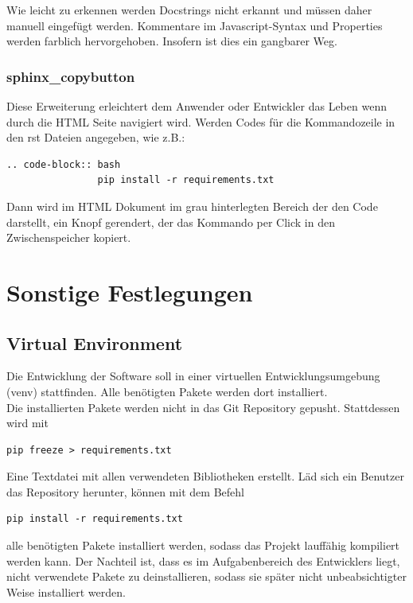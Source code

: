 Wie leicht zu erkennen werden Docstrings nicht erkannt und müssen daher manuell eingefügt werden.
Kommentare im Javascript-Syntax und Properties werden farblich hervorgehoben.
Insofern ist dies ein gangbarer Weg.

\subsubsection{sphinx\_copybutton}

Diese Erweiterung erleichtert dem Anwender oder Entwickler das Leben wenn durch die HTML Seite navigiert wird.
Werden Codes für die Kommandozeile in den rst Dateien angegeben, wie z.B.:
\begin{lstlisting}[label={lst:sphinxCodebutton}]
        .. code-block:: bash
                pip install -r requirements.txt
\end{lstlisting}
Dann wird im HTML Dokument im grau hinterlegten Bereich der den Code darstellt, ein Knopf gerendert,
der das Kommando per Click in den Zwischenspeicher kopiert.



\section{Sonstige Festlegungen}

\subsection{Virtual Environment}

Die Entwicklung der Software soll in einer virtuellen Entwicklungsumgebung (venv) stattfinden.
Alle benötigten Pakete werden dort installiert. \\

Die installierten Pakete werden nicht in das Git Repository gepusht. Stattdessen wird mit
\begin{lstlisting}[label={lst:freezeReq}]
        pip freeze > requirements.txt
\end{lstlisting}
Eine Textdatei mit allen verwendeten Bibliotheken erstellt.
Läd sich ein Benutzer das Repository herunter, können mit dem Befehl
\begin{lstlisting}[label={lst:installReq}]
        pip install -r requirements.txt
\end{lstlisting}
alle benötigten Pakete installiert werden, sodass das Projekt lauffähig kompiliert werden kann.
Der Nachteil ist, dass es im Aufgabenbereich des Entwicklers liegt, nicht verwendete Pakete zu deinstallieren,
sodass sie später nicht unbeabsichtigter Weise installiert werden.


